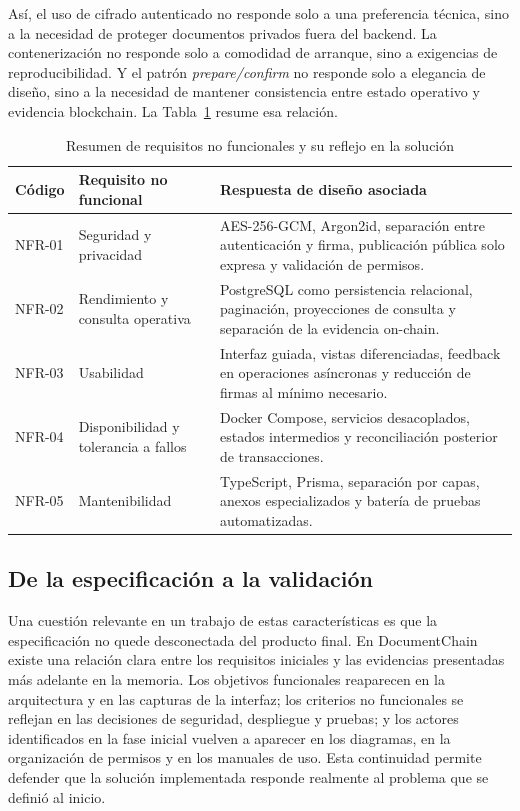 \documentclass[11pt, a4paper]{article}
\begin{document}
Así, el uso de cifrado autenticado no responde solo a una preferencia técnica, sino a la necesidad de proteger documentos privados fuera del backend. La contenerización no responde solo a comodidad de arranque, sino a exigencias de reproducibilidad. Y el patrón \textit{prepare/confirm} no responde solo a elegancia de diseño, sino a la necesidad de mantener consistencia entre estado operativo y evidencia blockchain. La Tabla~\ref{tab:nfr-resumen-memoria} resume esa relación.

\begin{table}[H]
    \centering
    \small
    \begin{tabular}{|p{2.3cm}|p{3.6cm}|p{7.2cm}|}
    \hline
    \textbf{Código} & \textbf{Requisito no funcional} & \textbf{Respuesta de diseño asociada} \\
    \hline
    NFR-01 & Seguridad y privacidad & AES-256-GCM, Argon2id, separación entre autenticación y firma, publicación pública solo expresa y validación de permisos. \\
    \hline
    NFR-02 & Rendimiento y consulta operativa & PostgreSQL como persistencia relacional, paginación, proyecciones de consulta y separación de la evidencia on-chain. \\
    \hline
    NFR-03 & Usabilidad & Interfaz guiada, vistas diferenciadas, feedback en operaciones asíncronas y reducción de firmas al mínimo necesario. \\
    \hline
    NFR-04 & Disponibilidad y tolerancia a fallos & Docker Compose, servicios desacoplados, estados intermedios y reconciliación posterior de transacciones. \\
    \hline
    NFR-05 & Mantenibilidad & TypeScript, Prisma, separación por capas, anexos especializados y batería de pruebas automatizadas. \\
    \hline
    \end{tabular}
    \caption{Resumen de requisitos no funcionales y su reflejo en la solución}
    \label{tab:nfr-resumen-memoria}
\end{table}

\subsection{De la especificación a la validación}

Una cuestión relevante en un trabajo de estas características es que la especificación no quede desconectada del producto final. En DocumentChain existe una relación clara entre los requisitos iniciales y las evidencias presentadas más adelante en la memoria. Los objetivos funcionales reaparecen en la arquitectura y en las capturas de la interfaz; los criterios no funcionales se reflejan en las decisiones de seguridad, despliegue y pruebas; y los actores identificados en la fase inicial vuelven a aparecer en los diagramas, en la organización de permisos y en los manuales de uso. Esta continuidad permite defender que la solución implementada responde realmente al problema que se definió al inicio.
\end{document}
